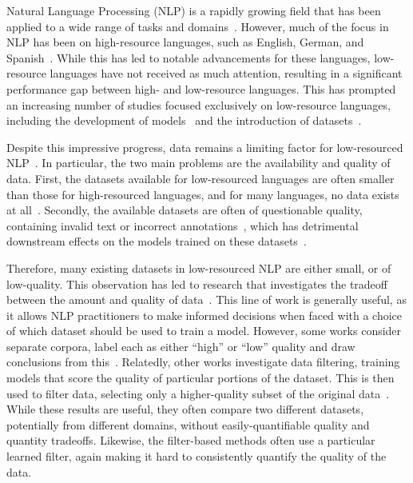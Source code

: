 Natural Language Processing (NLP) is a rapidly growing field that has been applied to a wide range of tasks and domains~\citep{vaswani2017Attention,conneau2019Unsupervised}. However, much of the focus in NLP has been on high-resource languages, such as English, German, and Spanish~\citep{vaswani2017Attention,conneau2019Unsupervised,radford2018Improving,radford2019language_gpt2}. While this has led to notable advancements for these languages, low-resource languages have not received as much attention, resulting in a significant performance gap between high- and low-resource languages. This has prompted an increasing number of studies focused exclusively on low-resource languages, including the development of models~\citep{ogueji2021Small,alabi2022Multilingual} and the introduction of datasets~\citep{oyewusi2021Naijaner,adelani2021MasakhaNER,adelani2022Thousand,adelani2022Masakhaner}.

Despite this impressive progress, data remains a limiting factor for low-resourced NLP~\citep{adelani2022Thousand,adelani2022Masakhaner}. In particular, the two main problems are the availability and quality of data. First, the datasets available for low-resourced languages are often smaller than those for high-resourced languages, and for many languages, no data exists at all~\citep{martinus2019Focus,adelani2021MasakhaNER}. Secondly, the available datasets are often of questionable quality, containing invalid text or incorrect annotations~\citep{kreutzer2021Quality}, which has detrimental downstream effects on the models trained on these datasets~\citep{abdul2012Extrinsic,alabi2019Massive}.

Therefore, many existing datasets in low-resourced NLP are either small, or of low-quality. This observation has led to research that investigates the tradeoff between the amount and quality of data~\citep{gasco-etal-2012-data,alabi2019Massive,abdulmumin2022Separating,de-gibert-bonet-etal-2022-quality}. This line of work is generally useful, as it allows NLP practitioners to make informed decisions when faced with a choice of which dataset should be used to train a model. However, some works consider separate corpora, label each as either ``high'' or ``low'' quality and draw conclusions from this~\citep{alabi2019Massive}. Relatedly, other works investigate data filtering, training models that score the quality of particular portions of the dataset. This is then used to filter data, selecting only a higher-quality subset of the original data~\citep{abdulmumin2022Separating,de-gibert-bonet-etal-2022-quality}. 
While these results are useful, they often compare two different datasets, potentially from different domains, without easily-quantifiable quality and quantity tradeoffs. Likewise, the filter-based methods often use a particular learned filter, again making it hard to consistently quantify the quality of the data.

